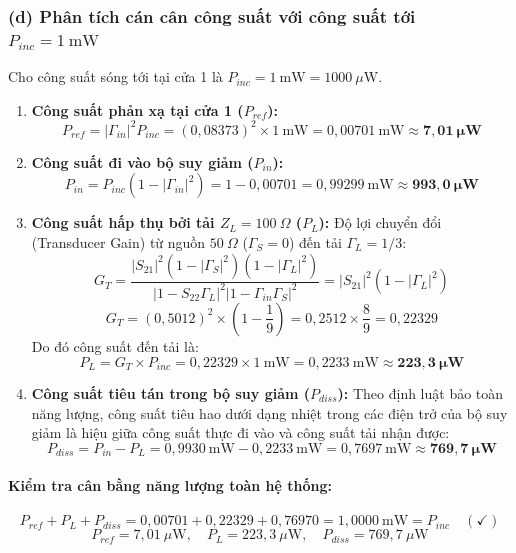 \documentclass[12pt,a4paper]{article}
\begin{document}
\subsubsection{(d) Phân tích cán cân công suất với công suất tới $P_{inc} = 1~\text{mW}$}
Cho công suất sóng tới tại cửa 1 là $P_{inc} = 1~\text{mW} = 1000~\mu\text{W}$.
\begin{enumerate}
    \item \textbf{Công suất phản xạ tại cửa 1 ($P_{ref}$):}
    \[
    P_{ref} = |\Gamma_{in}|^2 P_{inc} = (0{,}08373)^2 \times 1~\text{mW} = 0{,}00701~\text{mW} \approx \mathbf{7{,}01~\mu\text{W}}
    \]
    \item \textbf{Công suất đi vào bộ suy giảm ($P_{in}$):}
    \[
    P_{in} = P_{inc} (1 - |\Gamma_{in}|^2) = 1 - 0{,}00701 = 0{,}99299~\text{mW} \approx \mathbf{993{,}0~\mu\text{W}}
    \]
    \item \textbf{Công suất hấp thụ bởi tải $Z_L = 100~\Omega$ ($P_L$):}
    Độ lợi chuyển đổi (Transducer Gain) từ nguồn $50~\Omega$ ($\Gamma_S = 0$) đến tải $\Gamma_L = 1/3$:
    \[
    G_T = \frac{|S_{21}|^2 (1 - |\Gamma_S|^2)(1 - |\Gamma_L|^2)}{|1 - S_{22}\Gamma_L|^2 |1 - \Gamma_{in}\Gamma_S|^2} = |S_{21}|^2 (1 - |\Gamma_L|^2)
    \]
    \[
    G_T = (0{,}5012)^2 \times \left(1 - \frac{1}{9}\right) = 0{,}2512 \times \frac{8}{9} = 0{,}22329
    \]
    Do đó công suất đến tải là:
    \[
    P_L = G_T \times P_{inc} = 0{,}22329 \times 1~\text{mW} = 0{,}2233~\text{mW} \approx \mathbf{223{,}3~\mu\text{W}}
    \]
    \item \textbf{Công suất tiêu tán trong bộ suy giảm ($P_{diss}$):}
    Theo định luật bảo toàn năng lượng, công suất tiêu hao dưới dạng nhiệt trong các điện trở của bộ suy giảm là hiệu giữa công suất thực đi vào và công suất tải nhận được:
    \[
    P_{diss} = P_{in} - P_L = 0{,}9930~\text{mW} - 0{,}2233~\text{mW} = 0{,}7697~\text{mW} \approx \mathbf{769{,}7~\mu\text{W}}
    \]
\end{enumerate}

\paragraph{Kiểm tra cân bằng năng lượng toàn hệ thống:}
\[
P_{ref} + P_L + P_{diss} = 0{,}00701 + 0{,}22329 + 0{,}76970 = 1{,}0000~\text{mW} = P_{inc} \quad (\checkmark)
\]
\[
\boxed{P_{ref} = 7{,}01~\mu\text{W}, \quad P_L = 223{,}3~\mu\text{W}, \quad P_{diss} = 769{,}7~\mu\text{W}}
\]

\newpage

\end{document}
